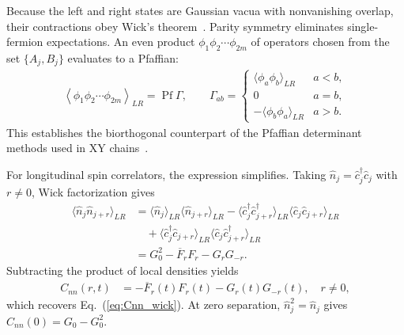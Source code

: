 \documentclass[aps,prb,reprint,superscriptaddress,amsmath,amssymb,floatfix]{revtex4-2}
\begin{document}
Because the left and right states are Gaussian vacua with nonvanishing overlap, their contractions obey Wick's theorem~\cite{BalianBrezin1969}. Parity symmetry eliminates single-fermion expectations. An even product $\phi_1\phi_2\cdots\phi_{2m}$ of operators chosen from the set $\{A_j, B_j\}$ evaluates to a Pfaffian:
\begin{equation}
\begin{aligned}
\left\langle \phi_1\phi_2\cdots\phi_{2m} \right\rangle_{LR}
\!=\!
\operatorname{Pf}\Gamma,
\qquad
{\Gamma_{ab}
\!=\!
\begin{cases}
\langle\phi_a\phi_b\rangle_{LR}
& a<b,
\\
0
& a=b
,\\
-\langle\phi_b\phi_a\rangle_{LR}
& a>b.
\end{cases}}
\end{aligned}
\label{eq:app_biorthogonal_pfaffian}
\end{equation}
This establishes the biorthogonal counterpart of the Pfaffian determinant methods used in XY chains~\cite{LiebSchultzMattis1961,BarouchMcCoy1971,CherngLevitov2006,Cincio2007,JafariPRR2025,NajiPRB2025}.

   For longitudinal spin correlators, the expression simplifies. Taking $\hat n_j=\hat c_j^\dagger\hat c_j$ with $r\neq0$, Wick factorization gives
\begin{equation}
\begin{aligned}
\langle \hat n_j\hat n_{j+r} \rangle_{LR} &= \langle \hat n_j\rangle_{LR} \langle \hat n_{j+r}\rangle_{LR} 
- \langle \hat c_j^\dagger\hat c_{j+r}^\dagger \rangle_{LR} \langle \hat c_j\hat c_{j+r} \rangle_{LR} \\ &\quad + \langle \hat c_j^\dagger\hat c_{j+r} \rangle_{LR} \langle \hat c_j\hat c_{j+r}^\dagger \rangle_{LR} \\ &= G_0^2 - \overline F_rF_r - G_rG_{-r}.
\end{aligned} \label{eq:app_density_wick_derivation}
\end{equation}
Subtracting the product of local densities yields
\begin{equation}
\begin{aligned}
C_{nn}(r,t) &= -\overline F_r(t)F_r(t) -G_r(t)G_{-r}(t), \quad r\neq0,
\end{aligned} \label{eq:app_Cnn_closed}
\end{equation}
which recovers Eq.~(\ref{eq:Cnn_wick}). At zero separation, $\hat n_j^2=\hat n_j$ gives $C_{nn}(0)=G_0-G_0^2$.
\end{document}

